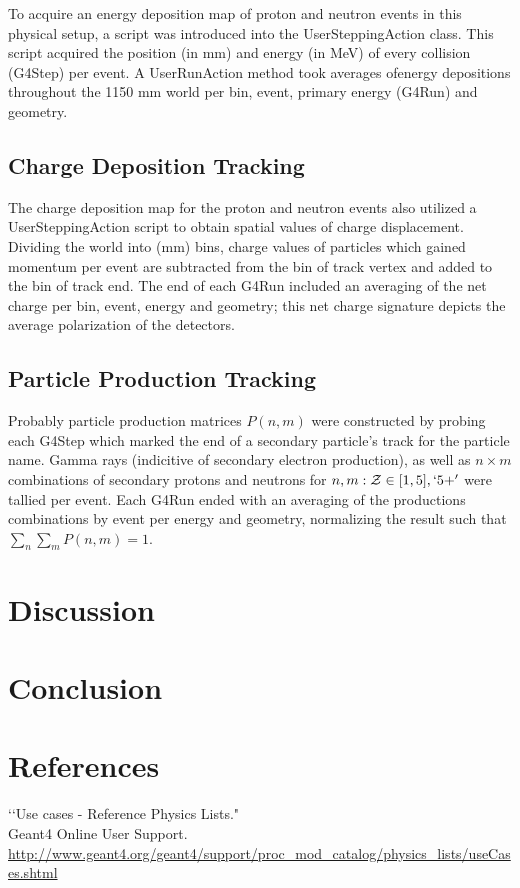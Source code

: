 \documentclass[11pt]{article}
\begin{document}
\begin{multicols}{2}
To acquire an energy deposition map of proton and neutron events in this physical setup, a script was introduced into the UserSteppingAction class.  This script acquired the position (in mm) and energy (in MeV) of every collision (G4Step) per event.  A UserRunAction method took averages ofenergy depositions throughout the 1150 mm world per bin, event, primary energy (G4Run) and geometry.

\subsection{Charge Deposition Tracking}

The charge deposition map for the proton and neutron events also utilized a UserSteppingAction script to obtain spatial values of charge displacement.  Dividing the world into (mm) bins, charge values of particles which gained momentum per event are subtracted from the bin of track vertex and added to the bin of track end.  The end of each G4Run included an averaging of the net charge per bin, event, energy and geometry; this net charge signature depicts the average polarization of the detectors.

\subsection{Particle Production Tracking}

Probably particle production matrices $P(n,m)$ were constructed by probing each G4Step which marked the end of a secondary particle's track for the particle name.  Gamma rays (indicitive of secondary electron production), as well as $n\times m$ combinations of secondary protons and neutrons for $n,m:\mathcal{Z}\in[1,5], \lq 5+'$ were tallied per event.  Each G4Run ended with an averaging of the productions combinations by event per energy and geometry, normalizing the result such that $\sum_n \sum_m P(n,m) = 1$.

\section{Discussion}

\section{Conclusion}

\section{References}
\begin{thebibliography}{99}

\lq\lq Use cases - Reference Physics Lists." \\
Geant4 Online User Support. \\
\url{http://www.geant4.org/geant4/support/proc_mod_catalog/physics_lists/useCases.shtml}
 
\end{thebibliography}

\end{multicols}
\end{document}

